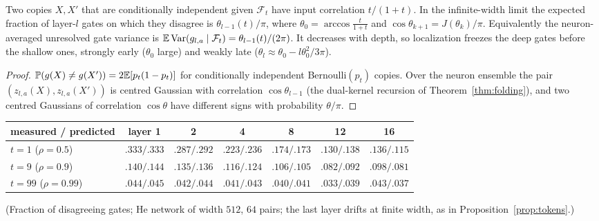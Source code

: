 \begin{theorem}\label{thm:depthtrickle}
Two copies $X,X'$ that are conditionally independent given $\mathcal F_t$ have input correlation $t/(1+t)$. In the infinite-width limit the
expected fraction of layer-$l$ gates on which they disagree is $\theta_{l-1}(t)/\pi$, where $\theta_0=\arccos\frac t{1+t}$ and
$\cos\theta_{k+1}=J(\theta_k)/\pi$. Equivalently the neuron-averaged unresolved gate variance is $\mathbb E\operatorname{Var}(g_{l,a}\mid\mathcal F_t)=\theta_{l-1}(t)/(2\pi)$. It
decreases with depth, so localization freezes the deep gates before the shallow ones, strongly early ($\theta_0$ large) and weakly late
($\theta_l\approx\theta_0-l\theta_0^2/3\pi$).
\end{theorem}
\begin{proof}
$\mathbb P(g(X)\ne g(X'))=2\mathbb E[p_t(1-p_t)]$ for conditionally independent Bernoulli$(p_t)$ copies. Over the neuron ensemble the pair
$(z_{l,a}(X),z_{l,a}(X'))$ is centred Gaussian with correlation $\cos\theta_{l-1}$ (the dual-kernel recursion of Theorem~\ref{thm:folding}), and two
centred Gaussians of correlation $\cos\theta$ have different signs with probability $\theta/\pi$.
\end{proof}
\begin{center}\small
\begin{tabular}{lcccccc}\toprule
measured / predicted & layer 1 & 2 & 4 & 8 & 12 & 16\\\midrule
$t=1$ ($\rho=0.5$) & $.333/.333$ & $.287/.292$ & $.223/.236$ & $.174/.173$ & $.130/.138$ & $.136/.115$\\
$t=9$ ($\rho=0.9$) & $.140/.144$ & $.135/.136$ & $.116/.124$ & $.106/.105$ & $.082/.092$ & $.098/.081$\\
$t=99$ ($\rho=0.99$) & $.044/.045$ & $.042/.044$ & $.041/.043$ & $.040/.041$ & $.033/.039$ & $.043/.037$\\\bottomrule
\end{tabular}
\end{center}
(Fraction of disagreeing gates; He network of width $512$, $64$ pairs; the last layer drifts at finite width, as in
Proposition~\ref{prop:tokens}.)

